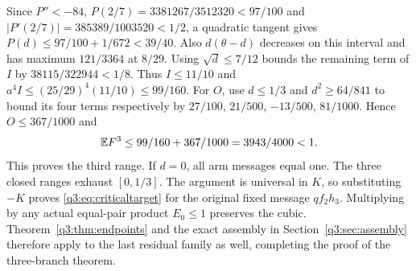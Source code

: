 Since $P''<-84$, $P(2/7)=3381267/3512320<97/100$ and
$|P'(2/7)|=385389/1003520<1/2$, a quadratic tangent gives
$P(d)\le97/100+1/672<39/40$.
Also $d(\theta-d)$ decreases on this interval and has maximum $121/3364$ at $8/29$.
Using $\sqrt d\le7/12$ bounds the remaining term of $I$ by
$38115/322944<1/8$. Thus $I\le11/10$ and
$a^4I\le(25/29)^4(11/10)\le99/160$.
For $O$, use $d\le1/3$ and $d^2\ge64/841$ to bound its four terms respectively by
$27/100$, $21/500$, $-13/500$, $81/1000$. Hence $O\le367/1000$ and
\[
 \mathbb E F^3\le99/160+367/1000=3943/4000<1 .
\]
This proves the third range. If $d=0$, all arm messages equal one.
The three closed ranges exhaust $[0,1/3]$. The argument is universal in $K$, so substituting $-K$ proves \eqref{q3:eq:criticaltarget} for the original fixed message $qf_2h_3$.
Multiplying by any actual equal-pair product $E_0\le1$ preserves the cubic.
Theorem~\ref{q3:thm:endpoints} and the exact assembly in Section~\ref{q3:sec:assembly} therefore apply to the last residual family as well, completing the proof of the three-branch theorem.
